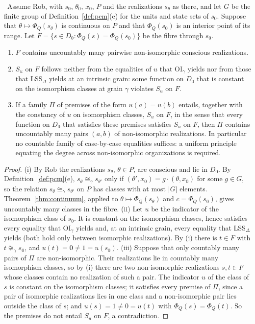 \begin{proposition}\label{prop:extension}
\stA\ Assume Rob, with $s_0$, $\theta_0$, $x_0$, $P$ and the realizations $s_\theta$ as there, and let $G$ be the finite group of Definition~\ref{def:pcm}(e) for the units and state sets of $s_0$. Suppose that $\theta\mapsto\Phi_Q(s_\theta)$ is continuous on $P$ and that $\Phi_Q(s_0)$ is an interior point of its range. Let $F=\{s\in D_0:\Phi_Q(s)=\Phi_Q(s_0)\}$ be the fibre through $s_0$.
\begin{enumerate}
\item[(i)] $F$ contains uncountably many pairwise non-isomorphic conscious realizations.
\item[(ii)] $S_u$ on $F$ follows neither from the equalities of $u$ that OI$_\gamma$ yields nor from those that LSS$_\Delta$ yields at an intrinsic grain: some function on $D_0$ that is constant on the isomorphism classes at grain $\gamma$ violates $S_u$ on $F$.
\item[(iii)] If a family $\Pi$ of premises of the form $u(a)=u(b)$ entails, together with the constancy of $u$ on isomorphism classes, $S_u$ on $F$, in the sense that every function on $D_0$ that satisfies these premises satisfies $S_u$ on $F$, then $\Pi$ contains uncountably many pairs $(a,b)$ of non-isomorphic realizations. In particular no countable family of case-by-case equalities suffices: a uniform principle equating the degree across non-isomorphic organizations is required.
\end{enumerate}
\end{proposition}
\begin{proof}
(i) By Rob the realizations $s_\theta$, $\theta\in P$, are conscious and lie in $D_0$. By Definition~\ref{def:pcm}(e), $s_\theta\cong_\gamma s_{\theta'}$ only if $(\theta',x_0)=g\cdot(\theta,x_0)$ for some $g\in G$, so the relation $s_\theta\cong_\gamma s_{\theta'}$ on $P$ has classes with at most $|G|$ elements. Theorem~\ref{thm:continuum}, applied to $\theta\mapsto\Phi_Q(s_\theta)$ and $c=\Phi_Q(s_0)$, gives uncountably many classes in the fibre.
(ii) Let $u$ be the indicator of the isomorphism class of $s_0$. It is constant on the isomorphism classes, hence satisfies every equality that OI$_\gamma$ yields and, at an intrinsic grain, every equality that LSS$_\Delta$ yields (both hold only between isomorphic realizations). By (i) there is $t\in F$ with $t\not\cong_\gamma s_0$, and $u(t)=0\ne1=u(s_0)$.
(iii) Suppose that only countably many pairs of $\Pi$ are non-isomorphic. Their realizations lie in countably many isomorphism classes, so by (i) there are two non-isomorphic realizations $s,t\in F$ whose classes contain no realization of such a pair. The indicator $u$ of the class of $s$ is constant on the isomorphism classes; it satisfies every premise of $\Pi$, since a pair of isomorphic realizations lies in one class and a non-isomorphic pair lies outside the class of $s$; and $u(s)=1\ne0=u(t)$ with $\Phi_Q(s)=\Phi_Q(t)$. So the premises do not entail $S_u$ on $F$, a contradiction.
\end{proof}

